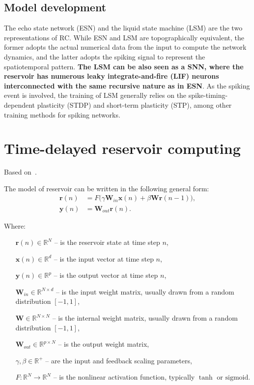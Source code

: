 \documentclass[11pt, oneside]{article}
\begin{document}
\subsection{Model development}


The echo state network (ESN)  and the liquid state machine (LSM)  are the two representations of RC.  While ESN and LSM are topographically equivalent, the former adopts the actual numerical data from the input to compute the network dynamics, and the latter adopts the spiking signal to represent the spatiotemporal pattern. \textbf{The LSM can be also seen as a SNN, where the reservoir has numerous leaky integrate-and-fire (LIF) neurons interconnected with the same recursive nature as in ESN}. As the spiking event is involved, the training of LSM generally relies on the spike-timing-dependent plasticity (STDP)  and short-term plasticity (STP), among other training methods for spiking networks.


\section{Time-delayed reservoir computing}
Based on~\cite{Grigoryeva2016, Parlitz2024, Ortn2015}.

The model of reservoir can be written in the following general form:
\begin{align}
    \mathbf{r}(n) & = F\big( \gamma \mathbf{W}_{in} \mathbf{x}(n) + \beta \mathbf{W} \mathbf{r}(n-1) \big), \\
    \mathbf{y}(n) & = \mathbf{W}_{out} \mathbf{r}(n).
    \label{eq:tdrc}
\end{align}


Where:
\begin{itemize}[noitemsep, leftmargin=4cm, label={}]
    \item [\(\mathbf{r}(n) \in \mathbb{R}^N\)] -- is the reservoir state at time step \(n\),
    \item [\(\mathbf{x}(n) \in \mathbb{R}^d\)] -- is the input vector at time step \(n\),
    \item [\(\mathbf{y}(n) \in \mathbb{R}^p\)] -- is the output vector at time step \(n\),
    \item [\(\mathbf{W}_{in} \in \mathbb{R}^{N \times d}\)] -- is the input weight matrix, usually drawn from a random distribution \([-1, 1]\),
    \item [\(\mathbf{W} \in \mathbb{R}^{N \times N}\)] -- is the internal weight matrix, usually drawn from a random distribution \([-1, 1]\),
    \item [\(\mathbf{W}_{out} \in \mathbb{R}^{p \times N}\)] -- is the output weight matrix,
    \item [\(\gamma, \beta \in \mathbb{R}^+\)] -- are the input and feedback scaling parameters,
    \item [\(F: \mathbb{R}^N \to \mathbb{R}^N\)] -- is  the nonlinear activation function, typically \(\tanh\) or \(\mathrm{sigmoid}\).
\end{itemize}
\end{document}
